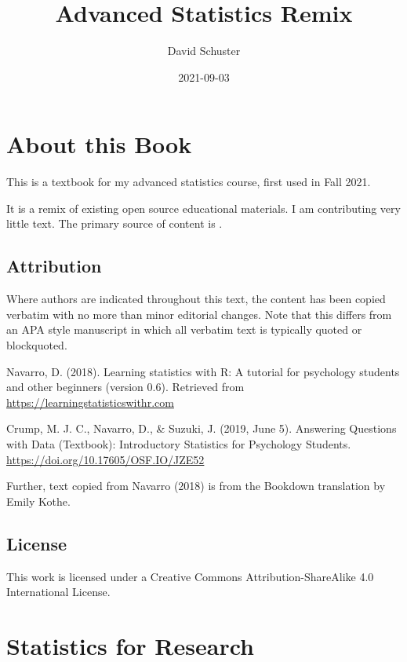 \documentclass[
]{book}
\title{Advanced Statistics Remix}
\author{David Schuster}
\date{2021-09-03}
\begin{document}
\maketitle

{
\setcounter{tocdepth}{1}
\tableofcontents
}
\hypertarget{about-this-book}{%
\chapter*{About this Book}\label{about-this-book}}

This is a textbook for my advanced statistics course, first used in Fall 2021.

It is a remix of existing open source educational materials. I am contributing very little text. The primary source of content is \citet{Navarro2018}.

\hypertarget{attribution}{%
\section*{Attribution}\label{attribution}}

Where authors are indicated throughout this text, the content has been copied verbatim with no more than minor editorial changes. Note that this differs from an APA style manuscript in which all verbatim text is typically quoted or blockquoted.

Navarro, D. (2018). Learning statistics with R: A tutorial for psychology students and other beginners (version 0.6). Retrieved from \url{https://learningstatisticswithr.com}

Crump, M. J. C., Navarro, D., \& Suzuki, J. (2019, June 5). Answering Questions with Data (Textbook): Introductory Statistics for Psychology Students. \url{https://doi.org/10.17605/OSF.IO/JZE52}

Further, text copied from Navarro (2018) is from the Bookdown translation by Emily Kothe.

\hypertarget{license}{%
\section*{License}\label{license}}

This work is licensed under a Creative Commons Attribution-ShareAlike 4.0 International License.

\hypertarget{statistics-for-research}{%
\chapter{Statistics for Research}\label{statistics-for-research}}
\end{document}
